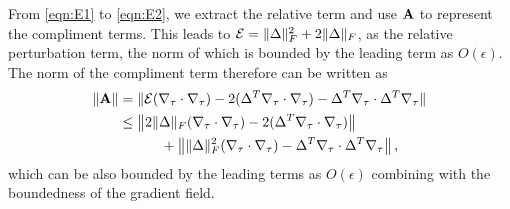 From \eqref{eqn:E1} to \eqref{eqn:E2}, we extract the relative term and use ${\mathbf A}$ to represent the compliment terms.
This leads to ${\mathcal E}  = \|\Delta\|_F^2 + 2\|\Delta\|_F$,
as the relative perturbation term, the norm of which is bounded by the leading term as $O(\epsilon)$. The norm of the compliment term therefore can be written as
\vspace{-1mm}
    \begin{align}
    \|{\mathbf A}\|& = \|{\mathcal E} (\nabla_\tau \cdot \nabla_\tau)- 2(\Delta^T \nabla_\tau \cdot \nabla_\tau )  - \Delta^T\nabla_\tau \cdot \Delta^T\nabla_\tau \|\\
   \nonumber &\leq \left\lVert2\|\Delta\|_F (\nabla_\tau \cdot \nabla_\tau) -  2(\Delta^T \nabla_\tau \cdot \nabla_\tau )\right\rVert\\
    &\qquad \quad +\left\lVert \|\Delta\|_F^2 (\nabla_\tau \cdot \nabla_\tau) - \Delta^T\nabla_\tau \cdot \Delta^T\nabla_\tau\right\rVert,
\end{align}
which can be also bounded by the leading terms as $O(\epsilon)$ combining with the boundedness of the gradient field.




